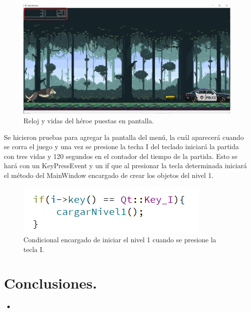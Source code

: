 \documentclass{article}
\begin{document}
\newpage
\begin{figure}[h]
\includegraphics[scale=0.45]{Images/tiempovidas.png}
\centering
\caption{Reloj y vidas del héroe puestas en pantalla.}
\label{fig:vidastiempo}
\end{figure}

Se hicieron pruebas para agregar la pantalla del menú, la cuál aparecerá cuando se corra el juego y una vez se presione la techa I del teclado iniciará la partida con tres vidas y 120 segundos en el contador del tiempo de la partida. Esto se hará con un KeyPressEvent y un if que al presionar la tecla determinada iniciará el método del MainWindow encargado de crear los objetos del nivel 1.

\begin{figure}[h]
\includegraphics[scale=1.5]{Images/keyi.png}
\centering
\caption{Condicional encargado de iniciar el nivel 1 cuando se presione la tecla I.}
\label{fig:vidastiempo}
\end{figure}



\section{Conclusiones.}
    \begin{itemize}
        \item
    \end{itemize}
\end{document}
